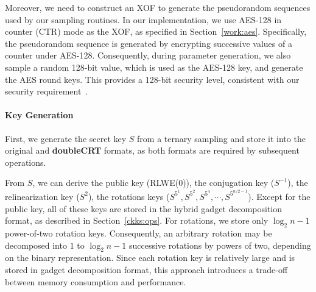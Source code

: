 Moreover, we need to construct an XOF to generate the pseudorandom sequences used by our sampling routines. In our implementation, we use AES-128 in counter (CTR) mode as the XOF, as specified in Section~\ref{work:aes}. Specifically, the pseudorandom sequence is generated by encrypting successive values of a counter under AES-128. Consequently, during parameter generation, we also sample a random 128-bit value, which is used as the AES-128 key, and generate the AES round keys. This provides a 128-bit security level, consistent with our security requirement~\cite{stallings2014network}.

\paragraph{Key Generation}

First, we generate the secret key $S$ from a ternary sampling and store it into the original and \textbf{doubleCRT} formats, as both formats are required by subsequent operations.



From $S$, we can derive the public key (RLWE(0)), the conjugation key ($S^{-1}$), the relinearization key ($S^2$), the rotations keys ($S^{5^1}, S^{5^2}, S^{5^4}, \cdots , S^{5^{n/2-1}}$). Except for the public key, all of these keys are stored in the hybrid gadget decomposition format, as described in Section~\ref{ckks:ops}. For rotations, we store only $\log_2 n - 1$ power-of-two rotation keys. Consequently, an arbitrary rotation may be decomposed into $1$ to $\log_2 n-1$ successive rotations by powers of two, depending on the binary representation. Since each rotation key is relatively large and is stored in gadget decomposition format, this approach introduces a trade-off between memory consumption and performance.

